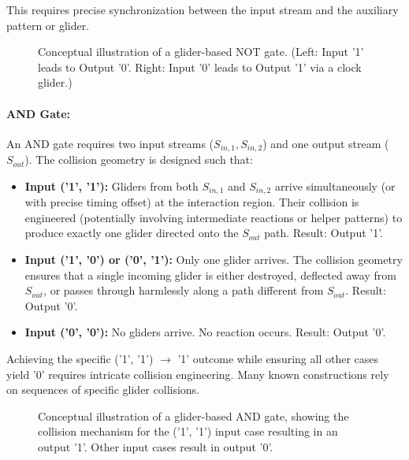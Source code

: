 \documentclass{article}
\theoremstyle{definition}
\theoremstyle{plain}
\theoremstyle{plain}
\begin{document}
This requires precise synchronization between the input stream and the auxiliary pattern or glider.

\begin{figure}[H]
  \centering
  \caption{Conceptual illustration of a glider-based NOT gate. (Left: Input '1' leads to Output '0'. Right: Input '0' leads to Output '1' via a clock glider.)}
  \label{fig:not-gate}
\end{figure}

\paragraph{AND Gate:} An AND gate requires two input streams ($S_{in,1}, S_{in,2}$) and one output stream ($S_{out}$). The collision geometry is designed such that:
\begin{itemize}
  \item \textbf{Input ('1', '1'):} Gliders from both $S_{in,1}$ and $S_{in,2}$ arrive simultaneously (or with precise timing offset) at the interaction region. Their collision is engineered (potentially involving intermediate reactions or helper patterns) to produce exactly one glider directed onto the $S_{out}$ path. Result: Output '1'.
  \item \textbf{Input ('1', '0') or ('0', '1'):} Only one glider arrives. The collision geometry ensures that a single incoming glider is either destroyed, deflected away from $S_{out}$, or passes through harmlessly along a path different from $S_{out}$. Result: Output '0'.
  \item \textbf{Input ('0', '0'):} No gliders arrive. No reaction occurs. Result: Output '0'.
\end{itemize}
Achieving the specific ('1', '1') $\to$ '1' outcome while ensuring all other cases yield '0' requires intricate collision engineering. Many known constructions rely on sequences of specific glider collisions.

\begin{figure}[H]
  \centering
  \caption{Conceptual illustration of a glider-based AND gate, showing the collision mechanism for the ('1', '1') input case resulting in an output '1'. Other input cases result in output '0'.}
  \label{fig:and-gate}
\end{figure}
\end{document}
